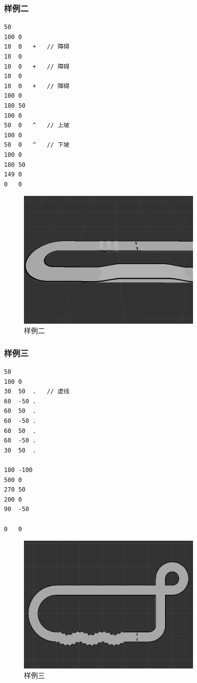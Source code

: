 \documentclass[titlepage,a4paper]{ctexart}
\begin{document}
\subsubsection{样例二}
\begin{lstlisting}
50
100	0
10	0	+	// 障碍
10	0
10	0	+	// 障碍
10	0
10	0	+	// 障碍
100	0
180	50
100	0
50	0	^	// 上坡
100	0
50	0	^	// 下坡
100	0
180	50
149	0
0	0
\end{lstlisting}
\begin{figure}[!htbp]
\centering
\includegraphics[width=0.80\textwidth]{demo2.png}
\caption{样例二}
\end{figure}
\subsubsection{样例三}
\begin{lstlisting}
50
100	0
30	50	.	// 虚线
60	-50	.
60	50	.
60	-50	.
60	50	.
60	-50	.
30	50	.

180	-100
500	0
270	50
200	0
90	-50

0	0
\end{lstlisting}
\begin{figure}[!htbp]
\centering
\includegraphics[width=0.80\textwidth]{demo3.png}
\caption{样例三}
\end{figure}
\newpage
\end{document}
